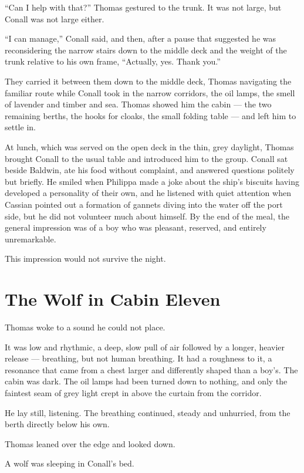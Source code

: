 \enquote{Can I help with that?} Thomas gestured to the trunk. It was not large, but Conall was not large either.

\enquote{I can manage,} Conall said, and then, after a pause that suggested he was reconsidering the narrow stairs down to the middle deck and the weight of the trunk relative to his own frame, \enquote{Actually, yes. Thank you.}

They carried it between them down to the middle deck, Thomas navigating the familiar route while Conall took in the narrow corridors, the oil lamps, the smell of lavender and timber and sea. Thomas showed him the cabin --- the two remaining berths, the hooks for cloaks, the small folding table --- and left him to settle in.

At lunch, which was served on the open deck in the thin, grey daylight, Thomas brought Conall to the usual table and introduced him to the group. Conall sat beside Baldwin, ate his food without complaint, and answered questions politely but briefly. He smiled when Philippa made a joke about the ship's biscuits having developed a personality of their own, and he listened with quiet attention when Cassian pointed out a formation of gannets diving into the water off the port side, but he did not volunteer much about himself. By the end of the meal, the general impression was of a boy who was pleasant, reserved, and entirely unremarkable.

This impression would not survive the night.

\section*{The Wolf in Cabin Eleven}

Thomas woke to a sound he could not place.

It was low and rhythmic, a deep, slow pull of air followed by a longer, heavier release --- breathing, but not human breathing. It had a roughness to it, a resonance that came from a chest larger and differently shaped than a boy's. The cabin was dark. The oil lamps had been turned down to nothing, and only the faintest seam of grey light crept in above the curtain from the corridor.

He lay still, listening. The breathing continued, steady and unhurried, from the berth directly below his own.

Thomas leaned over the edge and looked down.

A wolf was sleeping in Conall's bed.

